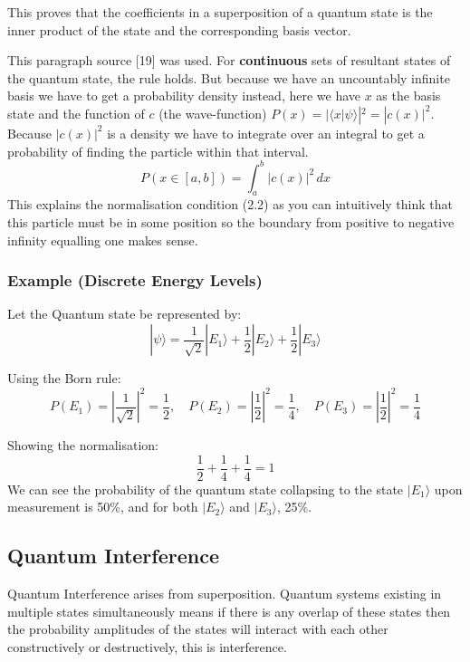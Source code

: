\noindent This proves that the coefficients in a superposition of a quantum state is the inner product of the state and the corresponding basis vector. 


\noindent This paragraph source [19] was used.
\noindent For \textbf{continuous} sets of resultant states of the quantum state, the rule holds. But because we have an uncountably infinite basis we have to get a probability density instead, here we have $x$ as the basis state and the function of $c$ (the wave-function) \(P(x) =  |\langle x | \psi \rangle|^2 =| c(x)|^2 \). Because $| c(x)|^2$ is a density we have to integrate over an integral to get a probability of finding the particle within that interval.
\begin{equation}
    P(x \in [a,b]) = \int_a^b |c(x)|^2 \, dx
\end{equation}
\noindent This explains the normalisation condition (2.2) as you can intuitively think that this particle must be in some position so the boundary from positive to negative infinity equalling one makes sense.


\subsubsection*{Example (Discrete Energy Levels)}

Let the Quantum state be represented by:
\[
|\psi\rangle = \frac{1}{\sqrt{2}} |E_1\rangle + \frac{1}{2} |E_2\rangle + \frac{1}{2} |E_3\rangle
\]

\noindent Using the Born rule:
\[
P(E_1) = \left| \frac{1}{\sqrt{2}} \right|^2 = \frac{1}{2}, \quad
P(E_2) = \left| \frac{1}{2} \right|^2 = \frac{1}{4}, \quad
P(E_3) = \left| \frac{1}{2} \right|^2 = \frac{1}{4}
\]

\noindent Showing the normalisation:
\[
\frac{1}{2} + \frac{1}{4} + \frac{1}{4} = 1
\]
\noindent We can see the probability of the quantum state collapsing to the state $|E_1\rangle$ upon measurement is 50\%, and for both $|E_2\rangle$ and $|E_3\rangle$, 25\%.




\subsection{Quantum Interference}

Quantum Interference arises from superposition. Quantum systems existing in multiple states simultaneously means if there is any overlap of these states then the probability amplitudes of the states will interact with each other constructively or destructively, this is interference.

